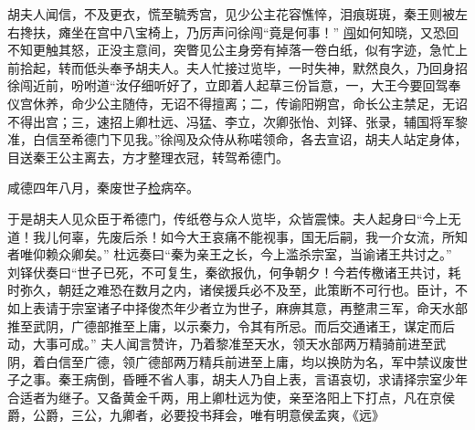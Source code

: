 \documentclass[UTF8]{ctexart}
\begin{document}
胡夫人闻信，不及更衣，慌至毓秀宫，见少公主花容憔悴，泪痕斑斑，秦王则被左右搀扶，瘫坐在宫中八宝椅上，乃厉声问徐闯“竟是何事！” \uline{闯}如何知晓，又恐回不知更触其怒，正没主意间，突瞥见公主身旁有掉落一卷白纸，似有字迹，急忙上前拾起，转而低头奉予胡夫人。夫人忙接过览毕，一时失神，默然良久，乃回身招徐闯近前，吩咐道“汝仔细听好了，立即着人起草三份旨意，一，大王今要回驾奉仪宫休养，命少公主随侍，无诏不得擅离；二，传谕阳朔宫，命长公主禁足，无诏不得出宫；三，速招上卿杜远、冯猛、李立，次卿张怡、刘铎、张录，辅国将军黎准，白信至希德门下见我。”徐闯及众侍从称喏领命，各去宣诏，胡夫人站定身体，目送秦王公主离去，方才整理衣冠，转驾希德门。

咸德四年八月，秦废世子\uline{检}病卒。

于是胡夫人见众臣于希德门，传纸卷与众人览毕，众皆震悚。夫人起身曰“今上无道！我儿何辜，先废后杀！如今大王哀痛不能视事，国无后嗣，我一介女流，所知者唯仰赖众卿矣。” 杜远奏曰“秦为亲王之长，今上滥杀宗室，当谕诸王共讨之。” 刘铎伏奏曰“世子已死，不可复生，秦欲报仇，何争朝夕！今若传檄诸王共讨，耗时弥久，朝廷之难恐在数月之内，诸侯援兵必不及至，此策断不可行也。臣计，不如上表请于宗室诸子中择俊杰年少者立为世子，麻痹其意，再整肃三军，命天水部推至武阴，广德部推至上庸，以示秦力，令其有所忌。而后交通诸王，谋定而后动，大事可成。” 夫人闻言赞许，乃着黎准至天水，领天水部两万精骑前进至武阴，着白信至广德，领广德部两万精兵前进至上庸，均以换防为名，军中禁议废世子之事。秦王病倒，昏睡不省人事，胡夫人乃自上表，言语哀切，求请择宗室少年合适者为继子。又备黄金千两，用上卿杜远为使，亲至洛阳上下打点，凡在京侯爵，公爵，三公，九卿者，必要投书拜会，唯有明意侯孟爽，《远》
\end{document}

